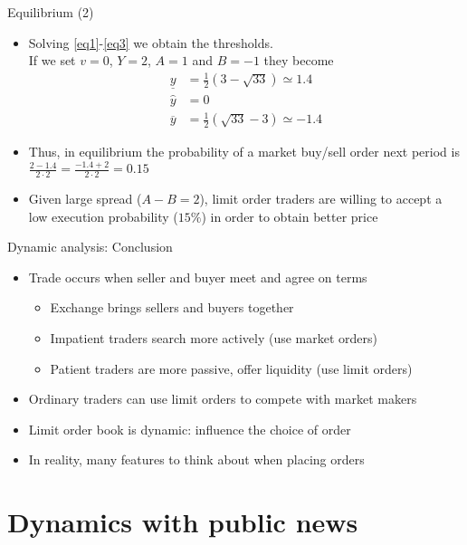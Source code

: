 \documentclass[english,10pt
,aspectratio=169
]{beamer}
\begin{document}
\begin{frame}{Equilibrium (2)}
	\begin{itemize}
		\item Solving \eqref{eq1}-\eqref{eq3} we obtain the thresholds. 
		\\
		If we set $v=0$, $Y=2$, $A=1$ and $B=-1$ they become
		\begin{align*}
		\underline{y} 	& = \frac{1}{2}(3-\sqrt{33}) \simeq 1.4 \\
		\hat{y} 	& = 0 \\
		\overline{y} 		& = \frac{1}{2}(\sqrt{33}-3) \simeq -1.4 
		\end{align*}
		\item Thus, in equilibrium the probability of a market buy/sell order next period is $\frac{2-1.4}{2\cdot 2}=\frac{-1.4+2}{2 \cdot 2}=0.15$
		\item Given  large spread ($A-B=2$), limit order traders are willing to accept a low execution probability ($15\%$) in order to obtain better price
	\end{itemize}
\end{frame}


\begin{frame}[label=parlourmain]{Dynamic analysis: Conclusion}
\begin{itemize}
	\item Trade occurs when seller and buyer meet and agree on terms
	\begin{itemize}
		\item Exchange brings sellers and buyers together
		\item Impatient traders search more actively (use market orders)
		\item Patient traders are more passive, offer liquidity (use limit orders)
	\end{itemize}
	\item Ordinary traders can use limit orders to compete with market makers
	\item Limit order book is dynamic: influence the choice of order
	\item In reality, many features to think about when placing orders
\end{itemize}
\end{frame}


\section{Dynamics with public news}
\end{document}
